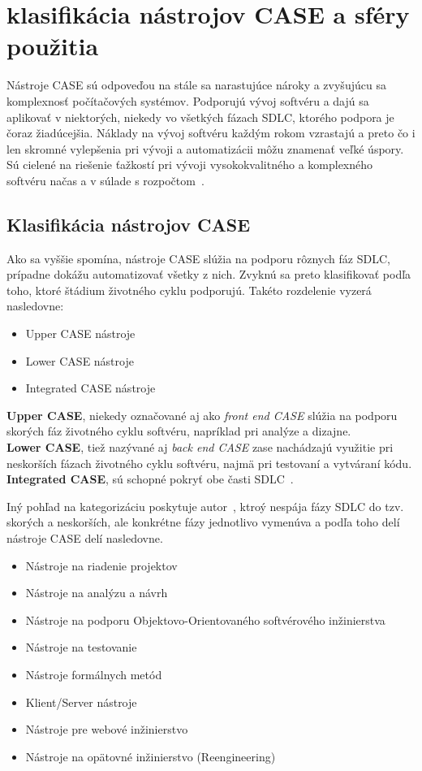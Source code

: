 \documentclass[10pt,twoside,slovak,a4paper]{article}
\begin{document}
\section{klasifikácia nástrojov CASE a sféry použitia}\label{typy CASE}

Nástroje CASE sú odpoveďou na stále sa narastujúce nároky a zvyšujúcu sa komplexnosť počítačových systémov. Podporujú vývoj softvéru a dajú sa aplikovať v niektorých, niekedy vo všetkých fázach SDLC, ktorého podpora je čoraz žiadúcejšia. Náklady na vývoj softvéru každým rokom vzrastajú a preto čo i len skromné vylepšenia pri vývoji a automatizácii môžu znamenať veľké úspory.  Sú cielené na riešenie ťažkostí pri vývoji vysokokvalitného a komplexného softvéru načas a v súlade s rozpočtom~\cite{2001}.
\subsection{Klasifikácia nástrojov CASE}\label{klasifikácia}
Ako sa vyššie spomína, nástroje CASE slúžia na podporu rôznych fáz SDLC, prípadne dokážu automatizovať všetky z nich. Zvyknú sa preto klasifikovať podľa toho, ktoré štádium životného cyklu podporujú. Takéto rozdelenie vyzerá nasledovne:

\begin{itemize}
\item Upper CASE nástroje
\item Lower CASE nástroje
\item Integrated CASE nástroje
\end{itemize}
\textbf{Upper CASE}, niekedy označované aj ako \emph{front end CASE} slúžia na podporu skorých fáz životného cyklu softvéru, napríklad pri analýze a dizajne.\\
\textbf{Lower CASE}, tiež nazývané aj \emph{back end CASE} zase nachádzajú využitie pri neskorších fázach životného cyklu softvéru, najmä pri testovaní a vytváraní kódu.\\
\textbf{Integrated CASE}, sú schopné pokryť obe časti SDLC~\cite{1998}.


Iný pohľad na kategorizáciu poskytuje autor~\cite{2017}, ktroý nespája fázy SDLC do tzv. skorých a neskorších, ale konkrétne fázy jednotlivo vymenúva a podľa toho delí nástroje CASE delí nasledovne.
\begin{itemize}
\item Nástroje na riadenie projektov
\item Nástroje na analýzu a návrh
\item Nástroje na podporu Objektovo-Orientovaného softvérového inžinierstva
\item Nástroje na testovanie
\item Nástroje formálnych metód
\item Klient/Server nástroje
\item Nástroje pre webové inžinierstvo
\item Nástroje na opätovné inžinierstvo (Reengineering)
\end{itemize}
\end{document}
